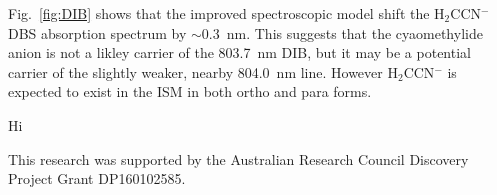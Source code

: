 \documentclass[journal=jpcafh,manuscript=article,layout=onecolumn, 12pt]{achemso}
\begin{document}
Fig.~\ref{fig:DIB} shows that the improved spectroscopic model shift the H$_2$CCN$^-$ DBS absorption spectrum by $\sim0.3$~nm. This suggests that the cyaomethylide anion is not a likley carrier of the 803.7~nm DIB, but it may be a potential carrier of the slightly weaker, nearby 804.0~nm line. However H$_2$CCN$^-$ is expected to exist in the ISM in both ortho and para forms. 





Hi~\cite{law17}

\begin{acknowledgement}
	This research was supported by the Australian Research Council Discovery
	Project Grant DP160102585.   
\end{acknowledgement}


\end{document}
